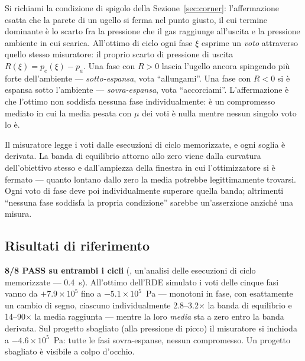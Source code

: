 Si richiami la condizione di spigolo della
Sezione~\ref{sec:corner}: l'affermazione esatta che la parete di un
ugello si ferma nel punto giusto, il cui termine dominante è lo
scarto fra la pressione che il gas raggiunge all'uscita e la
pressione ambiente in cui scarica. All'ottimo di ciclo ogni fase
$\xi$ esprime un \emph{voto} attraverso quello stesso misuratore: il
proprio scarto di pressione di uscita $R(\xi) = p_e(\xi) - p_a$. Una
fase con $R > 0$ lascia l'ugello ancora spingendo più forte
dell'ambiente --- \emph{sotto-espansa}, vota ``allungami''. Una fase
con $R < 0$ si è espansa sotto l'ambiente --- \emph{sovra-espansa},
vota ``accorciami''. L'affermazione è che l'ottimo non soddisfa
nessuna fase individualmente: è un compromesso mediato in cui la
media pesata con $\mu$ dei voti è nulla mentre nessun singolo voto
lo è.

Il misuratore legge i voti dalle esecuzioni di ciclo memorizzate, e
ogni soglia è derivata. La banda di equilibrio attorno allo zero
viene dalla curvatura dell'obiettivo stesso e dall'ampiezza della
finestra in cui l'ottimizzatore si è fermato --- quanto lontano
dallo zero la media potrebbe legittimamente trovarsi. Ogni voto di
fase deve poi individualmente superare quella banda; altrimenti
``nessuna fase soddisfa la propria condizione'' sarebbe
un'asserzione anziché una misura.

\subsection{Risultati di riferimento}

\textbf{8/8 PASS su entrambi i cicli}
(, un'analisi delle
esecuzioni di ciclo memorizzate --- 0.4~s). All'ottimo dell'RDE
simulato i voti delle cinque fasi vanno da $+7.9\times10^{5}$ fino a
$-5.1\times10^{5}$~Pa --- monotoni in fase, con esattamente un
cambio di segno, ciascuno individualmente 2.8--3.2$\times$ la banda
di equilibrio e 14--90$\times$ la media raggiunta --- mentre la loro
\emph{media} sta a zero entro la banda derivata. Sul progetto
sbagliato (alla pressione di picco) il misuratore si inchioda a
$-4.6\times10^{5}$~Pa: tutte le fasi sovra-espanse, nessun
compromesso. Un progetto sbagliato è visibile a colpo d'occhio.

